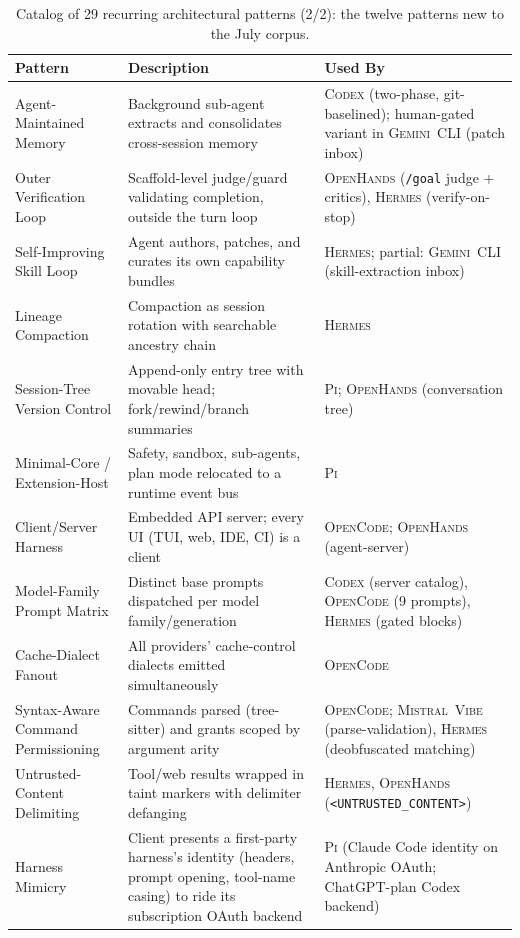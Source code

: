 \documentclass[11pt,a4paper]{article}
\newcommand{\cdx}{\textsc{Codex}\xspace}
\newcommand{\oh}{\textsc{OpenHands}\xspace}
\newcommand{\vibe}{\textsc{Mistral~Vibe}\xspace}
\newcommand{\gemini}{\textsc{Gemini~CLI}\xspace}
\newcommand{\hrm}{\textsc{Hermes}\xspace}
\newcommand{\pib}{\textsc{Pi}\xspace}
\newcommand{\ocd}{\textsc{OpenCode}\xspace}
\begin{document}
\begin{table}[H]
\centering
\caption{Catalog of 29 recurring architectural patterns (2/2): the twelve patterns new to the July corpus.}
\label{tab:patterns2}
\scriptsize
\renewcommand{\arraystretch}{1.2}
\begin{tabularx}{\textwidth}{@{}L{3cm} L{4.6cm} L{4.9cm}@{}}
\toprule
\textbf{Pattern} & \textbf{Description} & \textbf{Used By} \\
\midrule
Agent-Maintained Memory   & Background sub-agent extracts and consolidates cross-session memory & \cdx{} (two-phase, git-baselined); human-gated variant in \gemini{} (patch inbox) \\
Outer Verification Loop   & Scaffold-level judge/guard validating completion, outside the turn loop & \oh{} (\texttt{/goal} judge + critics), \hrm{} (verify-on-stop) \\
Self-Improving Skill Loop & Agent authors, patches, and curates its own capability bundles & \hrm{}; partial: \gemini{} (skill-extraction inbox) \\
Lineage Compaction        & Compaction as session rotation with searchable ancestry chain & \hrm{} \\
Session-Tree Version Control & Append-only entry tree with movable head; fork/rewind/branch summaries & \pib{}; \oh{} (conversation tree) \\
Minimal-Core / Extension-Host & Safety, sandbox, sub-agents, plan mode relocated to a runtime event bus & \pib{} \\
Client/Server Harness     & Embedded API server; every UI (TUI, web, IDE, CI) is a client & \ocd{}; \oh{} (agent-server) \\
Model-Family Prompt Matrix & Distinct base prompts dispatched per model family/generation & \cdx{} (server catalog), \ocd{} (9 prompts), \hrm{} (gated blocks) \\
Cache-Dialect Fanout      & All providers' cache-control dialects emitted simultaneously & \ocd{} \\
Syntax-Aware Command Permissioning & Commands parsed (tree-sitter) and grants scoped by argument arity & \ocd{}; \vibe{} (parse-validation), \hrm{} (deobfuscated matching) \\
Untrusted-Content Delimiting & Tool/web results wrapped in taint markers with delimiter defanging & \hrm{}, \oh{} (\texttt{<UNTRUSTED\_CONTENT>}) \\
Harness Mimicry           & Client presents a first-party harness's identity (headers, prompt opening, tool-name casing) to ride its subscription OAuth backend & \pib{} (Claude Code identity on Anthropic OAuth; ChatGPT-plan Codex backend) \\
\bottomrule
\end{tabularx}
\end{table}
\end{document}
